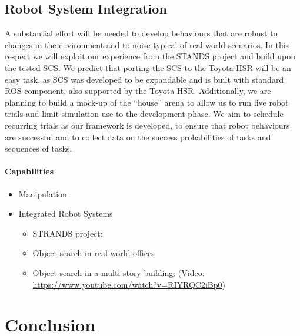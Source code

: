 \documentclass[runningheads,a4paper]{llncs}
\begin{document}
\subsection{Robot System Integration}
A substantial effort will be needed to develop behaviours that are robust to
changes in the environment and to noise typical of real-world scenarios. In this
respect we will exploit our experience from the STANDS project 
\cite{strands@ram} and build upon the tested SCS. We predict that porting the
SCS to the Toyota HSR will be an easy task, as SCS was developed to be 
expandable and is built with standard ROS component, also supported by the
Toyota HSR. Additionally, we are planning to build a mock-up of the ``house''
arena to
allow us to run live robot trials and limit simulation use to the development
phase. We aim to schedule recurring trials as our framework is developed, to
ensure that robot behaviours are successful and to collect data on the 
success probabilities of tasks and sequences of tasks.

\paragraph{Capabilities}
\begin{itemize}

    \item Manipulation
    \item Integrated Robot Systems
        \begin{itemize}
            \item STRANDS project: \cite{strands@ram}
            \item Object search in real-world offices \cite{kunze14indirect}
            \item Object search in a multi-story building: \cite{kunze12objsearch} (Video: \url{https://www.youtube.com/watch?v=RIYRQC2iBp0})

        \end{itemize}
\end{itemize}


\section{Conclusion}



\end{document}
